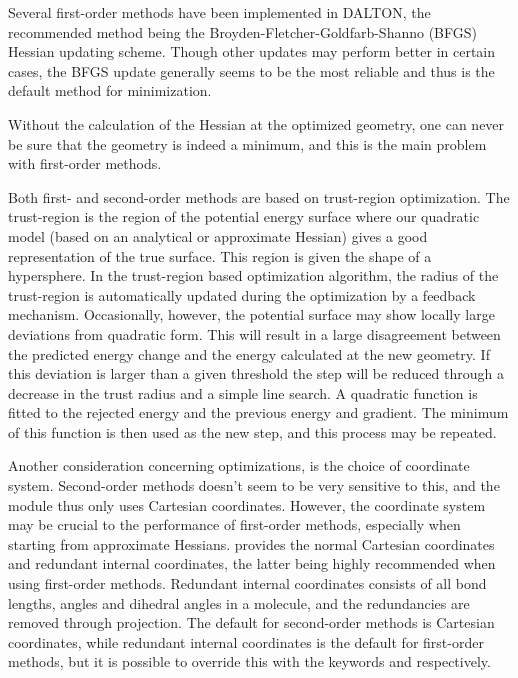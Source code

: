 Several first-order methods have been implemented in DALTON, the
recommended method being the Broyden-Fletcher-Goldfarb-Shanno (BFGS)
Hessian updating scheme. Though other
updates may perform better in
certain cases, the BFGS update generally seems to be the most
reliable and thus is the default method for minimization.

Without the calculation of the Hessian at the optimized geometry, one
can never be sure that the geometry is indeed a minimum, and this is the
main problem with first-order methods.

Both first- and second-order methods are based on
trust-region
optimization. The trust-region is the region of the potential energy
surface where our quadratic model (based on an analytical or
approximate Hessian) gives a good representation of the true
surface. This region is given the shape of a
hypersphere. In the trust-region based optimization algorithm, the
radius of the trust-region is
automatically updated during the optimization by a feedback mechanism.
Occasionally, however, the potential surface may show locally large
deviations from quadratic form. This will result in a large
disagreement between the predicted energy change and the energy
calculated at the new geometry. If this deviation is larger than a
given threshold the step will be reduced through a decrease in the
trust radius and a simple line search. A quadratic function is fitted
to the rejected energy and the previous energy and gradient. The
minimum of this function is then used as the new step, and this
process may be repeated.

Another consideration concerning optimizations, is the choice of
coordinate system. Second-order methods doesn't seem to be very
sensitive to this, and the  module thus only uses
Cartesian coordinates. However, the coordinate system may be crucial
to the performance of first-order methods, especially when starting
from approximate Hessians.  provides the normal Cartesian
coordinates and redundant
internal coordinates,
the latter being highly recommended when using
first-order methods. Redundant internal coordinates consists of all
bond lengths, angles and dihedral angles in a molecule, and the
redundancies are removed through projection. The default for
second-order methods is Cartesian coordinates, while redundant
internal coordinates is the default for first-order methods, but it is
possible to override this with the keywords  and
 respectively.

